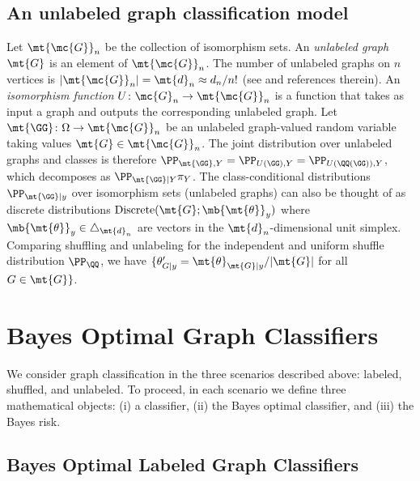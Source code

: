 \subsection{An unlabeled graph classification model} %
\label{sub:an_unlabeled_graph_classification_model}


Let $\mt{\mc{G}}_n$ be the collection of isomorphism sets.
An \emph{unlabeled graph} $\mt{G}$ is an element of $\mt{\mc{G}}_n$. The number of unlabeled graphs on $n$ vertices is $|\mt{\mc{G}}_n|=\mt{d}_n \approx d_n/n!$ (see \cite{A000088} and references therein).
An \emph{isomorphism function} $U\colon \mc{G}_n \to \mt{\mc{G}}_n$ is a function that takes as input a graph and outputs the corresponding unlabeled graph. Let $\mt{\GG}\colon \Omega \to \mt{\mc{G}}_n$ be an unlabeled graph-valued random variable taking values $\mt{G} \in \mt{\mc{G}}_n$.   The joint distribution over unlabeled graphs and classes is therefore
$\PP_{\mt{\GG},Y}=\PP_{U(\GG),Y}=\PP_{U(\QQ(\GG)),Y}$, which decomposes as $\PP_{\mt{\GG}|Y} \pi_Y$. The class-conditional distributions $\PP_{\mt{\GG} | y}$ over isomorphism sets (unlabeled graphs) can also be thought of as discrete distributions $\text{Discrete}(\mt{G}; \mb{\mt{\theta}}_y)$ where $\mb{\mt{\theta}}_y\in \triangle_{\mt{d}_n}$ are vectors in the $\mt{d}_n$-dimensional unit simplex.   Comparing shuffling and unlabeling for the independent and uniform shuffle distribution $\PP_{\QQ}$, we have $\{\theta_{G|y}'=\mt{\theta}_{\mt{G}|y}/|\mt{G}|$ for all $G \in \mt{G}\}$.  




\section{Bayes Optimal Graph Classifiers} %
\label{sec:bayes_optimal_graph_classifiers}

We consider graph classification in the three scenarios described above: labeled, shuffled, and unlabeled.  To proceed, in each scenario we define three mathematical objects: (i) a classifier, (ii) the Bayes optimal classifier, and (iii) the Bayes risk.

\subsection{Bayes Optimal Labeled Graph Classifiers} %
\label{sub:labeled_graph_classifiers}

